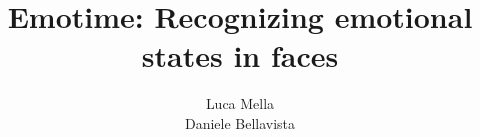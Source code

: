 \documentclass[11pt]{article}
\newcommand{\xautha}{Luca Mella}
\newcommand{\xauthb}{Daniele Bellavista}
\newcommand{\xtitle}{Emotime: Recognizing emotional states in faces}
\begin{document}
\title{\xtitle}
\author{\xautha\\\xauthb}

\maketitle


%


{}
\end{document}
